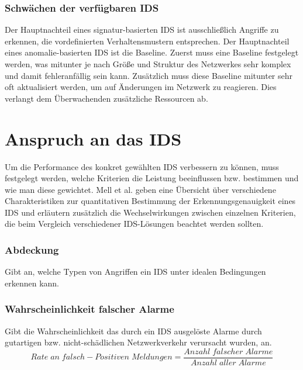 \subsubsection{Schwächen der verfügbaren IDS}
Der Hauptnachteil eines signatur-basierten IDS ist ausschließlich Angriffe zu erkennen, die vordefinierten Verhaltensmustern entsprechen. Der Hauptnachteil eines anomalie-basierten IDS ist die Baseline. Zuerst muss eine Baseline festgelegt werden, was mitunter je nach Größe und Struktur des Netzwerkes sehr komplex und damit fehleranfällig sein kann. Zusätzlich muss diese Baseline mitunter sehr oft aktualisiert werden, um auf Änderungen im Netzwerk zu reagieren. Dies verlangt dem Überwachenden zusätzliche Ressourcen ab.
\section{Anspruch an das IDS}
Um die Performance des konkret gewählten IDS verbessern zu können, muss festgelegt werden, welche Kriterien die Leistung beeinflussen bzw. bestimmen und wie man diese gewichtet.
Mell et al.\cite{mell2003overview} geben eine Übersicht über verschiedene Charakteristiken zur quantitativen Bestimmung der Erkennungsgenauigkeit eines IDS und erläutern zusätzlich die Wechselwirkungen zwischen einzelnen Kriterien, die beim Vergleich verschiedener IDS-Lösungen beachtet werden sollten.
\subsubsection{Abdeckung}
Gibt an, welche Typen von Angriffen ein IDS unter idealen Bedingungen erkennen kann.
\subsubsection{Wahrscheinlichkeit falscher Alarme}
Gibt die Wahrscheinlichkeit das durch ein IDS ausgelöste Alarme durch gutartigen bzw. nicht-schädlichen Netzwerkverkehr verursacht wurden, an.\\
\[Rate\;an\;falsch-Positiven\;Meldungen = \frac{Anzahl\;falscher\;Alarme}{Anzahl\;aller\;Alarme}\]
